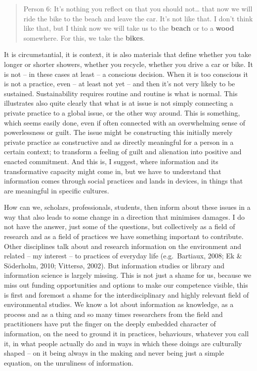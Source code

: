 \documentclass[a4paper,
fontsize=11pt,
oneside,
numbers=noperiodatend,
parskip=half-,
bibliography=totoc,
final
]{scrartcl}
\begin{document}
\begin{quote}
Person 6: It's nothing you reflect on that you should not\ldots{} that
now we will ride the bike to the beach and leave the car. It's not like
that. I don't think like that, but I think now we will take us to the
\textbf{beach} or to a \textbf{wood} somewhere. For this, we take the
\textbf{bikes}.
\end{quote}

It is circumstantial, it is context, it is also materials that define
whether you take longer or shorter showers, whether you recycle, whether
you drive a car or bike. It is not -- in these cases at least -- a
conscious decision. When it is too conscious it is not a practice, even
-- at least not yet -- and then it's not very likely to be sustained.
Sustainability requires routine and routine is what is normal. This
illustrates also quite clearly that what is at issue is not simply
connecting a private practice to a global issue, or the other way
around. This is something, which seems easily done, even if often
connected with an overwhelming sense of powerlessness or guilt. The
issue might be constructing this initially merely private practice as
constructive and as directly meaningful for a person in a certain
context; to transform a feeling of guilt and alienation into positive
and enacted commitment. And this is, I suggest, where information and
its transformative capacity might come in, but we have to understand
that information comes through social practices and lands in devices, in
things that are meaningful in specific cultures.

How can we, scholars, professionals, students, then inform about these
issues in a way that also leads to some change in a direction that
minimises damages. I do not have the answer, just some of the questions,
but collectively as a field of research and as a field of practices we
have something important to contribute. Other disciplines talk about and
research information on the environment and related -- my interest -- to
practices of everyday life (e.g.~Bartiaux, 2008; Ek \& Söderholm, 2010;
Vittersø, 2002). But information studies or library and information
science is largely missing. This is not just a shame for us, because we
miss out funding opportunities and options to make our competence
visible, this is first and foremost a shame for the interdisciplinary
and highly relevant field of environmental studies. We know a lot about
information as knowledge, as a process and as a thing and so many times
researchers from the field and practitioners have put the finger on the
deeply embedded character of information, on the need to ground it in
practices, behaviours, whatever you call it, in what people actually do
and in ways in which these doings are culturally shaped -- on it being
always in the making and never being just a simple equation, on the
unruliness of information.
\end{document}

